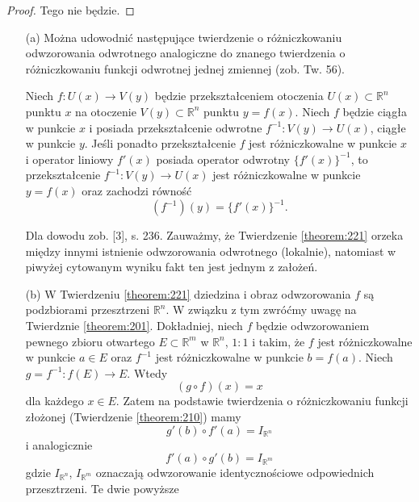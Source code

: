 \documentclass[leqno]{article}
\begin{document}
\begin{justify}
\begin{proof}
    Tego nie będzie.
\end{proof}

\begin{uwaga}
    \begin{itemize}
        \item [(a)] Można udowodnić następujące twierdzenie o różniczkowaniu odwzorowania odwrotnego analogiczne do znanego twierdzenia 
            o różniczkowaniu funkcji odwrotnej jednej zmiennej (zob. Tw. 56).
            \begin{textit}
            Niech $f : U(x) \to V(y)$ będzie przekształceniem otoczenia $U(x) \subset \mathbb{R}^n$ punktu $x$ na otoczenie $V(y) \subset \mathbb{R}^n$
            punktu $y = f(x)$. Niech $f$ będzie ciągła w punkcie $x$ i posiada przekształcenie odwrotne $f^{-1} : V(y) \to U(x)$, ciągłe w punkcie $y$.
            Jeśli ponadto przekształcenie $f$ jest różniczkowalne w punkcie $x$ i operator liniowy $f'(x)$ posiada operator odwrotny ${\{f'(x)\}}^{-1}$, to 
            przekształcenie $f^{-1} : V(y) \to U(x)$ jest różniczkowalne w punkcie $y = f(x)$ oraz zachodzi równość 
            \[
                (f^{-1})(y) = {\{f'(x)\}}^{-1}.
            \]
            \end{textit}
            Dla dowodu zob. [3], s. 236. Zauważmy, że Twierdzenie \ref{theorem:221} orzeka między innymi istnienie odwzorowania odwrotnego (lokalnie), 
            natomiast w piwyżej cytowanym wyniku fakt ten jest jednym z założeń. 
        \item [(b)] W Twierdzeniu \ref{theorem:221} dziedzina i obraz odwzorowania $f$ są podzbiorami przesztrzeni $\mathbb{R}^n$.
            W związku z tym zwróćmy uwagę na Twierdznie \ref{theorem:201}. Dokładniej, niech $f$ będzie odwzorowaniem pewnego zbioru otwartego $E \subset \mathbb{R}^m$ w $\mathbb{R}^n$, $1 : 1$ i takim, że $f$ jest różniczkowalne w punkcie $a \in E$ oraz $f^{-1}$ jest różniczkowalne w punkcie $b = f(a)$. Niech
            $g = f^{-1} : f(E) \to E$. Wtedy 
            \[
                (g \circ f)(x) = x 
            \]
            dla każdego $x \in E$. Zatem na podstawie twierdzenia o różniczkowaniu funkcji złożonej (Twierdzenie \ref{theorem:210})
            mamy 
            \[
                g'(b) \circ f'(a) = I_{\mathbb{R}^n}
            \]
            i analogicznie 
            \[
                f'(a) \circ g'(b) = I_{\mathbb{R}^m}
            \]
            gdzie $I_{\mathbb{R}^n}$, $I_{\mathbb{R}^m}$ oznaczają odwzorowanie identycznościowe odpowiednich przesztrzeni. Te dwie powyższe 

\end{itemize}
\end{uwaga}
\end{justify}
\end{document}
